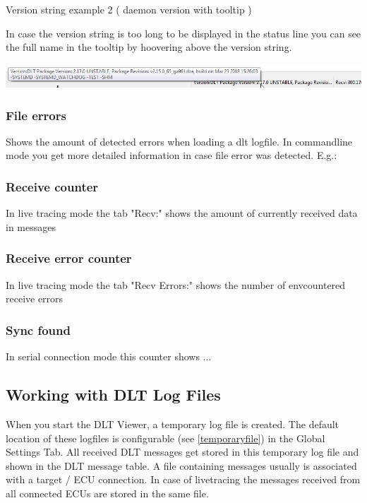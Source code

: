 \documentclass[a4paper,11pt]{article}
\begin{document}
\vspace{0.5cm}

Version string example 2 ( daemon version with tooltip )\linebreak

In case the version string is too long to be displayed in the status line you can see the full name in the tooltip by hoovering above the version string.\\

\vspace{0.2cm}

\includegraphics[width=1.0\textwidth]{images/versionstringwithtooltip.png}

\subsubsection{File errors}
Shows the amount of detected errors when loading a dlt logfile. In commandline mode
you get more detailed information in case file error was detected. E.g.:

 

\subsubsection{Receive counter}
In live tracing mode the tab "Recv:" shows the amount of currently received data in messages

\subsubsection{Receive error counter}
In live tracing mode the tab "Recv Errors:" shows the number of envcountered receive errors

\subsubsection{Sync found}
In serial connection mode this counter shows ...


\pagebreak

\subsection{Working with DLT Log Files}
When you start the DLT Viewer, a temporary log file is created. The default location of these logfiles is configurable (see \autoref{temporaryfile}) in the Global Settings Tab.
All received DLT messages get stored in this temporary log file and shown in the DLT message table.
A file containing messages usually is associated with a target / ECU connection. In case of livetracing the messages received from all connected
ECUs are stored in the same file.
\end{document}
